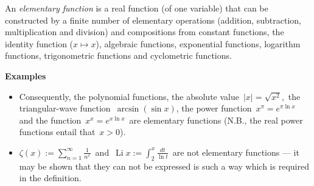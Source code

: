 \documentclass[12pt]{article}
\DeclareMathOperator{\Li}{Li}
\begin{document}
An {\em elementary function} is a real function (of one variable) that can be constructed by a finite number of elementary operations (addition, subtraction, multiplication and division) and compositions from constant functions, the identity function ($x \mapsto x$), algebraic functions, exponential functions, logarithm functions, trigonometric functions and cyclometric functions.

\textbf{Examples}
\begin{itemize}
 \item Consequently, the polynomial functions, the absolute value\, $|x| = \sqrt{x^2}$,\, the triangular-wave function\, $\arcsin(\sin{x})$, the power function\, $x^{\pi} = e^{\pi\ln{x}}$\, and the function\, $x^x = e^{x\ln{x}}$\, are elementary functions (N.B., the real power functions entail that\, $x > 0$).
 \item $\displaystyle\zeta(x) := \sum_{n = 1}^{\infty}\frac{1}{n^x}$\, and\, $\displaystyle\Li{x} := \int_2^{x}\frac{dt}{\ln{t}}$\, are not elementary functions --- it may be shown that they can not be expressed is such a way which is required in the definition.
\end{itemize}
\end{document}
